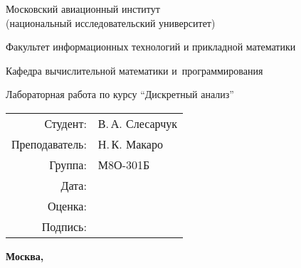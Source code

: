 \begin{titlepage}
\begin{center}
\bfseries

{\Large Московский авиационный институт\\ (национальный исследовательский университет)

}

\vspace{48pt}

{\large Факультет информационных технологий и прикладной математики
}

\vspace{36pt}

{\large Кафедра вычислительной математики и~программирования

}


\vspace{48pt}

Лабораторная работа  по курсу \enquote{Дискретный анализ}

\end{center}

\vspace{72pt}

\begin{flushright}
\begin{tabular}{rl}
Студент: & В.\,А. Слесарчук \\
Преподаватель: & Н.\,К. Макаро \\
Группа: & М8О-301Б \\
Дата: & \\
Оценка: & \\
Подпись: & \\
\end{tabular}
\end{flushright}

\vfill

\begin{center}
\bfseries
Москва, \the\year
\end{center}
\end{titlepage}

\pagebreak